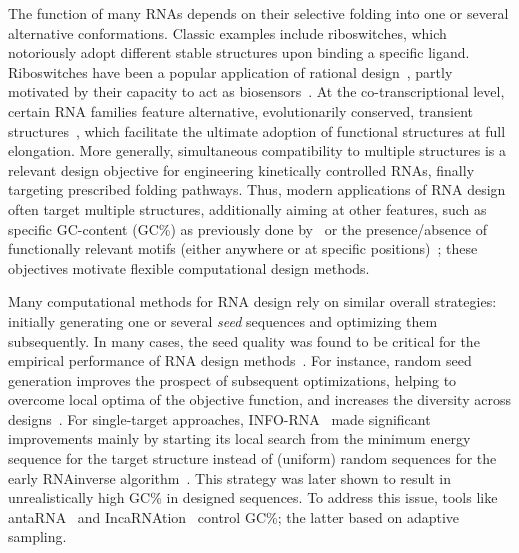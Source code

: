 \documentclass{bmcart}
\newcommand{\Def}[1]{\emph{#1}}
\newcommand{\parHead}[1]{\Final{\paragraph{#1}}}
\newcommand{\Final}[1]{\begingroup\color{red!70!black}#1\endgroup}
\renewcommand{\Final}[1]{}
\newcommand{\Nuc}[1]{{\sf #1}}
\newcommand{\Cb}{\Nuc{C}}
\newcommand{\Gb}{\Nuc{G}}
\newcommand{\GCb}{\Gb\Cb}
\newcommand{\Software}[1]{{\ttfamily #1}}
\newcommand{\citep}[1]{\cite{#1}}
\newcommand{\citet}[1]{\cite{#1}}
\begin{document}
\parHead{Motivating multiple RNA design.} The function of many RNAs
depends on their selective folding into one or several alternative
conformations. Classic examples include riboswitches, which
notoriously adopt different stable structures upon binding a specific
ligand. Riboswitches have been a popular application of rational
design~\citep{Wachsmuth2013,Domin2017}, partly motivated by their
capacity to act as biosensors~\citep{Findeiss2017}. At the
co-transcriptional level, certain RNA families feature alternative,
evolutionarily conserved, transient structures~\citep{Zhu2013}, which
facilitate the ultimate adoption of functional structures at full
elongation.  More generally, simultaneous compatibility to multiple
structures is a relevant design objective for engineering kinetically
controlled RNAs, finally targeting prescribed folding pathways. Thus,
modern applications of RNA design often target multiple structures,
additionally aiming at other features, such as specific
\GCb-content (\GCb\%) as previously done by~\citet{Reinharz2013} or the presence/absence of
functionally relevant motifs (either anywhere or at specific
positions)~\citep{Zhou2013}; these objectives motivate flexible
computational design methods.

\parHead{On the importance of sampling for design.}
Many computational methods for RNA design rely on similar overall
strategies: initially generating one or several \Def{seed} sequences
and optimizing them subsequently. In many cases, the seed quality was
found to be critical for the empirical performance of RNA design
methods~\citep{Levin2012}. For instance, random seed generation
improves the prospect of subsequent optimizations, helping to overcome
local optima of the objective function, and increases the diversity
across designs~\citep{Reinharz2013}.  For single-target approaches,
\Software{INFO-RNA}~\citep{Busch2006} made significant improvements
mainly by starting its local search from the minimum energy sequence
for the target structure instead of (uniform) random sequences for the
early \Software{RNAinverse} algorithm~\citep{Hofacker1994}. This
strategy was later shown to result in unrealistically high
\GCb\% in designed sequences. To address this issue,
tools like \Software{antaRNA}~\citep{Kleinkauf2015} and \Software{IncaRNAtion}~\citep{Reinharz2013} control \GCb\%; the latter based on adaptive sampling.
\end{document}
